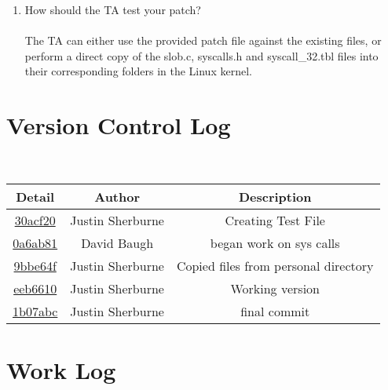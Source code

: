 \documentclass[10pt,drafclsnofoot,onecolumn]{IEEEtran}
\begin{document}
\begin{enumerate}
\item{How should the TA test your patch?}
\\ \\  The TA can either use the provided patch file against the existing files, or perform a direct copy of the slob.c, syscalls.h and syscall\_32.tbl files into their corresponding folders in the Linux kernel. 


\end{enumerate}

\section{Version Control Log}
\' \\ \centering
\begin{tabular}{c c c}
	\textbf{Detail} & \textbf{Author} & \textbf{Description}\\\hline
	
	\href{dirname "$origin"/basename "$origin" .git/commit/30acf20ec0d5ff6d9eb79d70f65ee313dfbdcb03}{30acf20} & Justin Sherburne & Creating Test File\\\hline
	\href{dirname "$origin"/basename "$origin" .git/commit/0a6ab81b575d19e109ce26b022b1bbf18fc151f9}{0a6ab81} & David Baugh & began work on sys calls\\\hline
	\href{dirname "$origin"/basename "$origin" .git/commit/9bbe64f75a2edcbbf11a1a62d162427d3521c6f3}{9bbe64f} & Justin Sherburne & Copied files from personal directory\\\hline
	\href{dirname "$origin"/basename "$origin" .git/commit/eeb6610280395c20665d5f24993ee8ecca86f6b4}{eeb6610} & Justin Sherburne & Working version\\\hline
	\href{dirname "$origin"/basename "$origin" .git/commit/1b07abc087cdb7b8d35872f30411728d777bcc67}{1b07abc} & Justin Sherburne & final commit\\\hline
\end{tabular}

\section{Work Log}
\end{document}
